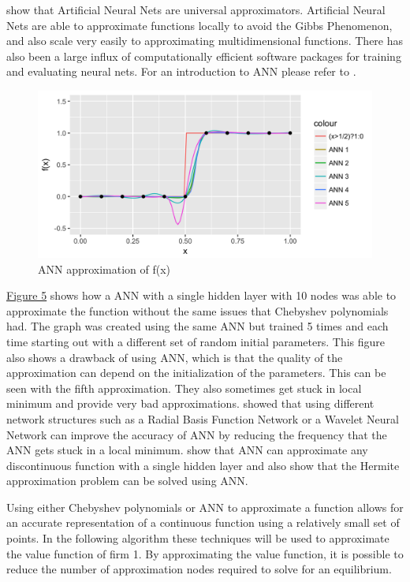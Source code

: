 \documentclass[12pt]{article}
\begin{document}
\cite{ann_uni} show that Artificial Neural Nets are universal approximators. Artificial Neural Nets are able to approximate functions locally to avoid the Gibbs Phenomenon, and also scale very easily to approximating multidimensional functions. There has also been a large influx of computationally efficient software packages for training and evaluating neural nets. For an introduction to ANN please refer to \citet{ann_tutorial}.

\begin{figure}[H]
  \label{ref_ANN_Ind_Func}
  \centering
  \includegraphics[scale=1]{plot_ANN_Ind_Func}
  \caption{ANN approximation of f(x)}
\end{figure}

\hyperref[ref_ANN_Ind_Func]{Figure 5} shows how a ANN with a single hidden layer with 10 nodes was able to approximate the function without the same issues that Chebyshev polynomials had. The graph was created using the same ANN but trained 5 times and each time starting out with a different set of random initial parameters. This figure also shows a drawback of using ANN, which is that the quality of the approximation can depend on the initialization of the parameters. This can be seen with the fifth approximation. They also sometimes get stuck in local minimum and provide very bad approximations. \citet{ann_radial} showed that using different network structures such as a Radial Basis Function Network or a Wavelet Neural Network can improve the accuracy of ANN by reducing the frequency that the ANN gets stuck in a local minimum. \citet{ann_disc} show that ANN can approximate any discontinuous function with a single hidden layer and \citet{ann_herm} also show that the Hermite approximation problem can be solved using ANN.

Using either Chebyshev polynomials or ANN to approximate a function allows for an accurate representation of a continuous function using a relatively small set of points. In the following algorithm these techniques will be used to approximate the value function of firm 1. By approximating the value function, it is possible to reduce the number of approximation nodes required to solve for an equilibrium.
\end{document}

